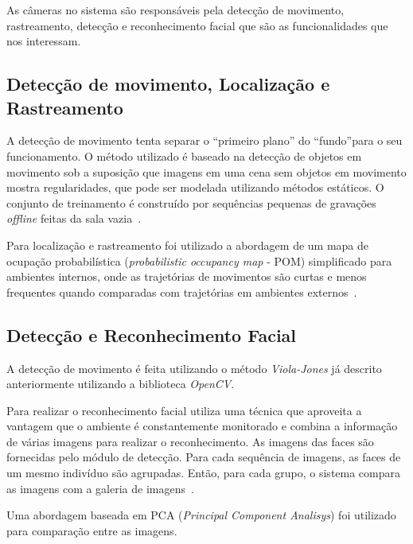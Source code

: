 As câmeras no sistema são responsáveis pela detecção de movimento, rastreamento, detecção e reconhecimento facial que são as funcionalidades que nos interessam.

\subsection{Detecção de movimento, Localização e Rastreamento}

A detecção de movimento tenta separar o ``primeiro plano'' do ``fundo''para o seu funcionamento. O método utilizado é baseado na detecção de objetos em movimento sob a suposição que imagens em uma cena sem objetos em movimento mostra regularidades, que pode ser modelada utilizando métodos estáticos. O conjunto de treinamento é construído por sequências pequenas de gravações \textit{offline} feitas da sala vazia~\cite{salah}.

Para localização e rastreamento foi utilizado a abordagem de um mapa de ocupação probabilística (\textit{probabilistic occupancy map} - POM) simplificado para ambientes internos, onde as trajetórias de movimentos são curtas e menos frequentes quando comparadas com trajetórias em ambientes externos~\cite{salah}.

\subsection{Detecção e Reconhecimento Facial}

A detecção de movimento é feita utilizando o método \textit{Viola-Jones} já descrito anteriormente utilizando a biblioteca \textit{OpenCV}. 

Para realizar o reconhecimento facial utiliza uma técnica que aproveita a vantagem que o ambiente é constantemente monitorado e combina a informação de várias imagens para realizar o reconhecimento. As imagens das faces são fornecidas pelo módulo de detecção.
Para cada sequência de imagens, as faces de um mesmo indivíduo são agrupadas. Então, para cada grupo, o sistema compara as imagens com a galeria de imagens~\cite{salah}. 

Uma abordagem baseada em PCA (\textit{Principal Component Analisys}) foi utilizado para comparação entre as imagens.


